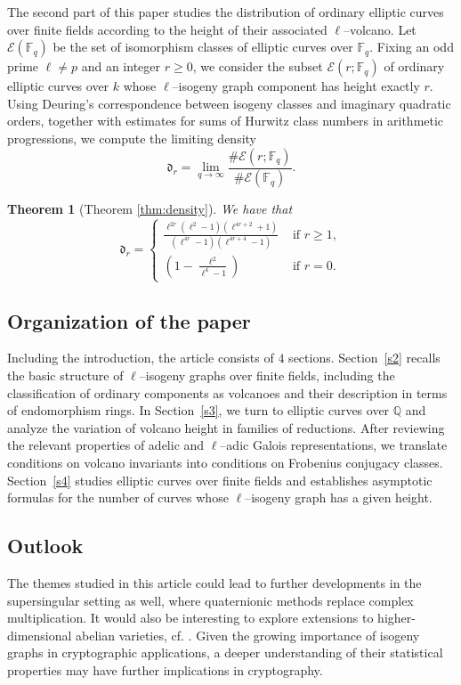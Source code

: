 \documentclass[table]{amsart}
\newtheorem{lthm}{Theorem}
\newcommand{\Q}{\mathbb{Q}}
\newcommand{\F}{\mathbb{F}}
\numberwithin{equation}{section}
\begin{document}
The second part of this paper studies the distribution of ordinary elliptic curves over finite fields according to the height of their associated $\ell$–volcano. Let $\mathcal{E}(\F_q)$ be the set of isomorphism classes of elliptic curves over $\F_q$. Fixing an odd prime $\ell\neq p$ and an integer $r\ge 0$, we consider the subset $\mathcal{E}(r;\F_q)$ of ordinary elliptic curves over $k$ whose $\ell$–isogeny graph component has height exactly $r$. Using Deuring’s correspondence between isogeny classes and imaginary quadratic orders, together with estimates for sums of Hurwitz class numbers in arithmetic progressions, we compute the limiting density
\[
\mathfrak{d}_r=\lim_{q\to\infty}\frac{\#\mathcal{E}(r;\F_q)}{\#\mathcal{E}(\F_q)}.
\]
\begin{lthm}[Theorem \ref{thm:density}]
We have that
\[
\mathfrak{d}_r
=
\begin{cases}\frac{\ell^{2r}(\ell^2-1)(\ell^{4r+2}+1)}
{(\ell^{4r}-1)(\ell^{4r+4}-1)}&\text{ if }r\geq 1,\\
\left(1-\frac{\ell^2}{\ell^4-1}\right)&\text{ if }r=0.
\end{cases}
\]
\end{lthm}


\subsection{Organization of the paper}

Including the introduction, the article consists of $4$ sections. Section~\ref{s2} recalls the basic structure of $\ell$–isogeny graphs over finite fields, including the classification of ordinary components as volcanoes and their description in terms of endomorphism rings. In Section~\ref{s3}, we turn to elliptic curves over $\Q$ and analyze the variation of volcano height in families of reductions. After reviewing the relevant properties of adelic and $\ell$–adic Galois representations, we translate conditions on volcano invariants into conditions on Frobenius conjugacy classes. Section~\ref{s4} studies elliptic curves over finite fields and establishes asymptotic formulas for the number of curves whose $\ell$–isogeny graph has a given height. 


\subsection{Outlook}
The themes studied in this article could lead to further developments in the supersingular setting as well, where quaternionic methods replace complex multiplication. It would also be interesting to explore extensions to higher-dimensional abelian varieties, cf. \cite{abvar1, abvar2}. Given the growing importance of isogeny graphs in cryptographic applications, a deeper understanding of their statistical properties may have further implications in cryptography.
\end{document}
